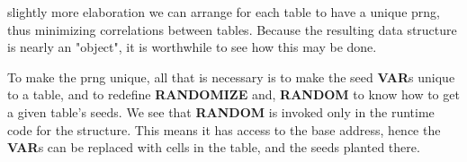 slightly more elaboration we can arrange for each table to have a unique prng, thus minimizing correlations between tables. Because the resulting data structure is nearly an "object", it is worthwhile to see how this may be done.

To make the prng unique, all that is necessary is to make the seed \textbf{VAR}s unique to a table, and to redefine \textbf{RANDOMIZE} and, \textbf{RANDOM} to know how to get a given table's seeds. We see that \textbf{RANDOM} is invoked only in the runtime code for the structure. This means it has access to the base address, hence the \textbf{VAR}s can be replaced with cells in the table, and the seeds planted there.